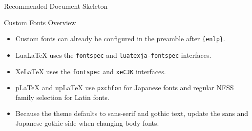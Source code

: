 \documentclass[10pt]{beamer}
\begin{document}
\begin{frame}{Recommended Document Skeleton}
\end{frame}

\begin{frame}{Custom Fonts Overview}
  \begin{itemize}
    \item Custom fonts can already be configured in the preamble after \texttt{\string\usetheme\{enlp\}}.
    \item LuaLaTeX uses the \texttt{fontspec} and \texttt{luatexja-fontspec} interfaces.
    \item XeLaTeX uses the \texttt{fontspec} and \texttt{xeCJK} interfaces.
    \item pLaTeX and upLaTeX use \texttt{pxchfon} for Japanese fonts and regular NFSS family selection for Latin fonts.
    \item Because the theme defaults to sans-serif and gothic text, update the sans and Japanese gothic side when changing body fonts.
  \end{itemize}
\end{frame}
\end{document}
